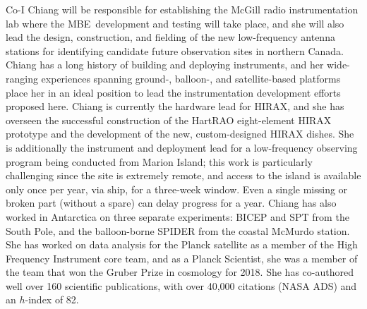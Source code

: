 \documentclass[11pt]{article}
\newcommand{\mbe}{{\rm MBE}}
\begin{document}
Co-I Chiang will be responsible for establishing the McGill radio
instrumentation lab where the \mbe\ development and testing will take
place, and she will also lead the design, construction, and fielding
of the new low-frequency antenna stations for identifying candidate
future observation sites in northern Canada.  Chiang has a long
history of building and deploying instruments, and her wide-ranging
experiences spanning ground-, balloon-, and satellite-based platforms
place her in an ideal position to lead the instrumentation development
efforts proposed here.  Chiang is currently the hardware lead for
HIRAX, and she has overseen the successful construction of the HartRAO
eight-element HIRAX prototype and the development of the new,
custom-designed HIRAX dishes.  She is additionally the instrument and
deployment lead for a low-frequency observing program being conducted
from Marion Island; this work is particularly challenging since the
site is extremely remote, and access to the island is available only
once per year, via ship, for a three-week window.  Even a single
missing or broken part (without a spare) can delay progress for a
year.  Chiang has also worked in Antarctica on three separate
experiments: BICEP and SPT from the South Pole, and the balloon-borne
SPIDER from the coastal McMurdo station.  She has worked on data
analysis for the Planck satellite as a member of the High Frequency
Instrument core team, and as a Planck Scientist, she was a member of
the team that won the Gruber Prize in cosmology for 2018.  She has
co-authored well over 160 scientific publications, with over 40,000
citations (NASA ADS) and an $h$-index of 82.
\end{document}
